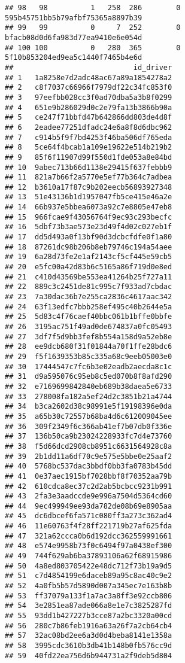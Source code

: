 \documentclass[
]{article}
\begin{document}
\begin{verbatim}
## 98   98          1   258  286        0 595b45751bb5b79afbf75365a8897b39
## 99   99          0     7  252        0 bfacb08d0d6fa983d77ea9410e6e054d
## 100 100          0   280  365        0 5f10b853204ed9ea5c1440f7465b4e6d
##                            id_driver
## 1   1a8258e7d2adc48ac67a89a1854278a2
## 2   c8f7037c66966f7979df22c34fc853f0
## 3   97eefbb028cc3f0ad70dba5a3b8f0299
## 4   651e9b286029d0c2e79fa13b3866b90a
## 5   ce247f71bbfd47b642866dd803de4d8f
## 6   2eadee77251dfadc24e6a8f8d6dbc962
## 7   c914b5f9f7bd4253f46ba506df765eda
## 8   5ce64f4bcab1a109e19622e514b219b2
## 9   85f6f11907d99f550d1fde053a8e84bd
## 10  9abec713b66d1138e29415f637febbb9
## 11  821a7b66f2a5770e5ef77b364c7adbea
## 12  b3610a17f87c9b202eecb56893927348
## 13  51e43136b1d1957047fb5ce415e46a2e
## 14  66b937e5bbea6073a92c7e8805e47eb8
## 15  966fcae9f43056764f9ec93c293becfc
## 16  5dbf73b3ae573e23d49f4d02c027eb1f
## 17  dd5d493a0f13bf90d3dcbcfdfe0f1a80
## 18  87261dc98b206b8eb79746c194a54aee
## 19  6a28d73fe2e1af2143cf5cf445e59cb5
## 20  e5fc00a42d83b6c5165a86f719d0e8ed
## 21  c410d43569be553ea41264b25f727a11
## 22  889c3c2451de81c995c7f933ad7cbdac
## 23  7a30dac36b7e255ca2836c4617aac342
## 24  63f13edfc7bbb258ef495c40b2644e5a
## 25  5d83c4f76caef40bbc061b1bffe0bbfe
## 26  3195ac751f49ad0de674837a0fc05493
## 27  3df7f5d9bb3fef8b554a158d9a52eb8e
## 28  ee9dcb680f31f01844a70f1ffe28bdc6
## 29  f5f1639353b85c335a68c9eeb05003e0
## 30  17444547c7fc6b3e02eadb2aecda8c1c
## 31  d9a595076c95eb8c5ed070b8f8afd290
## 32  e7169699842840eb689b38daea5e6733
## 33  278008fa182a5ef24d2c3851b21a4744
## 34  b3ca2602d38c98991e5f19198396e0da
## 35  a65b30c72557b68ba4d6c612009045ee
## 36  309f2349f6c366ab41ef7b07db0f336e
## 37  136b50ca9b23024228933fc7d4e73760
## 38  f5d66dcd2908cb8951c6631564928c8a
## 39  2b1dd11a6df70c9e575e5bbe0e25aaf2
## 40  5768bc537dac3bbdf0bb3fa0783b45dd
## 41  0e37aec1915bf7028bbf8f70352aa79b
## 42  610cdca8ec37c2d2ab5bcbcc9231b991
## 43  2fa3e3aadccde9e996a7504d5364cd60
## 44  9ec499949ee93da782de08b69e8905aa
## 45  dc6dbcef6fa571c080ff3a273c362ad4
## 46  11e60763f4f28ff221719b27af625fda
## 47  321a62ccca0b6d192dcc362559991661
## 48  e574e9958b73f0c6494f97a0438ef300
## 49  744f629ab6ba37893106a62f68915986
## 50  4a8ed803705422e48dc712f73b19a9d5
## 51  c7d4854199e6daceb89a95c8ac40c9e2
## 52  4a0fb5b57d5890d007a345ec7e163b8b
## 53  ff37079a133f1a7ac3a8ff3e92ccb806
## 54  3e2851ea87ade066a8e1e7c3825287fd
## 55  93dd1b427227b3cce87a2bc3320a00cd
## 56  280c7b86feb1916a63a26f7a2cb64cb4
## 57  32ac08bd2ee6a3d0d4beba8141e1358a
## 58  3995cdc3610b3db41b148b0fb576cc9d
## 59  40fd22ea756d6b944731a2f9deb5d804

\end{verbatim}
\end{document}
